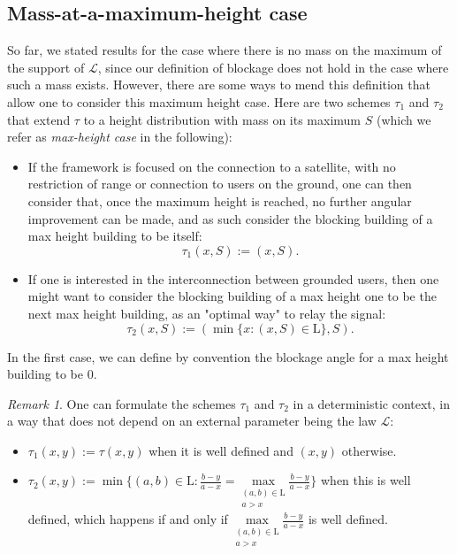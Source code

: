 \documentclass[10pt,english,a4paper]{smfart}
\theoremstyle{definition}
\theoremstyle{remark}
\newtheorem{remark}{Remark}
\newcommand{\landsc}{\mathrm{L}}
\renewcommand{\max}{\text{max}}
\begin{document}
\subsection{Mass-at-a-maximum-height case}\label{max_height}

So far, we stated results for the case where there is no mass on the maximum of the support of $\mathcal{L}$, since our definition of blockage does not hold in the case where such a mass exists. However, there are some ways to mend this definition that allow one to consider this maximum height case. Here are two schemes $\tau_1$ and $\tau_2$ that extend $\tau$ to a height distribution with mass on its maximum $S$ (which we refer as \textit{max-height case} in the following):
\begin{itemize}
    \item If the framework is focused on the connection to a satellite, with no restriction of range or connection to users on the ground, one can then consider that, once the maximum height is reached, no further angular improvement can be made, and as such consider the blocking building of a max height building to be itself:
    \[\tau_1(x, S) := (x, S).\]
    \item If one is interested in the interconnection between grounded users, then one might want to consider the blocking building of a max height one to be the next max height building, as an "optimal way" to relay the signal:
    \[\tau_2(x, S) := (\min\{x: (x, S)\in \landsc\},S).\] 
\end{itemize}

In the first case, we can define by convention the blockage angle for a max height building to be $0$.

\begin{remark}
One can formulate the schemes $\tau_1$ and $\tau_2$ in a deterministic context, in a way that does not depend on an external parameter being the law $\mathcal{L}$:
\begin{itemize}
    \item $\tau_1 (x, y):= \tau(x, y)$ when it is well defined and $(x, y)$ otherwise.
    \item $\tau_2 (x, y) := \min\{(a, b)\in \landsc: \frac{b-y}{a-x} = \underset{\substack{(a, b) \in \landsc \\a>x}}{\max} \frac{b-y}{a-x}\}$ when this is well defined, which happens if and only if $\underset{\substack{(a, b) \in \landsc \\a>x}}{\max} \frac{b-y}{a-x}$ is well defined.
\end{itemize}
\end{remark}
\end{document}
